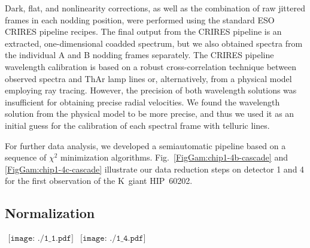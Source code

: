 \documentclass{aa}
\begin{document}
Dark, flat, and nonlinearity corrections, as well as the combination of raw jittered 
frames in each nodding position, were performed using the standard ESO CRIRES pipeline recipes. 
The final output from the CRIRES pipeline is an extracted, one-dimensional coadded spectrum, 
but we also obtained spectra from the individual A and B nodding frames separately.
The CRIRES pipeline wavelength calibration is based on a robust cross-correlation technique between observed spectra and
ThAr lamp lines or, alternatively, from a physical model employing ray tracing.
However, the precision of both wavelength solutions was insufficient for obtaining precise radial velocities. 
We found the wavelength solution from the physical model to be more precise, and thus we used it as an initial
guess for the calibration of each spectral frame with telluric lines.

For further data analysis, we developed a semiautomatic pipeline based on a sequence of 
$\chi^2$ minimization algorithms. Fig.~\ref{FigGam:chip1-4b-cascade} and \ref{FigGam:chip1-4c-cascade}
illustrate our data reduction steps on detector 1 and 4 for the first observation of the K~giant HIP~60202.
 
 
\subsection{Normalization}
\label{Normalization and line identification}


\begin{figure*}[htp!]
\begin{center}$
\begin{array}{cc} 
\texttt{[image: ./1\_1.pdf]} &
\texttt{[image: ./1\_4.pdf]} \\
\end{array} $

\end{center}
\caption{Top: model spectra of the telluric transmission for detectors one (left) and four (right).
Bottom: calibrated science spectra for both detectors (black) showing the stellar and telluric absorption lines. 
Only nonblended telluric lines were modeled (red) and used for constructing the wavelength solution.} 
 
\label{FigGam:chip1-4b-cascade}  
\end{figure*}
\end{document}
